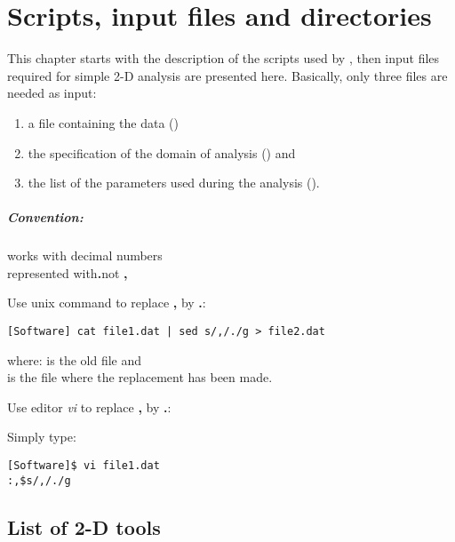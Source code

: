 \chapter{Scripts, input files and directories\label{chap:general}}

This chapter starts with the description of the scripts used by \diva, then input files required for simple 2-D analysis are presented here. 
Basically, only three files are needed as input:

\begin{enumerate}
\item a file containing the data ()
\item the specification of the domain of analysis () and 
\item the list of the parameters used during the analysis ().
\end{enumerate}


\minitoc

\newpage %


\paragraph*{Convention:} \diva works with decimal numbers\\ 
represented with\quad \textbf{.}\quad  not \quad \textbf{,}

\btips
Use unix command  to replace \textbf{,} by \textbf{.}:
\begin{lstlisting}[style=Bash]
[Software] cat file1.dat | sed s/,/./g > file2.dat
\end{lstlisting}

where:  is the old file and \\
\hphantom{where:}  is the file where the replacement has been made.
\etips


\btips
Use editor \textsl{vi} to replace \textbf{,} by \textbf{.}:

Simply type:
\begin{lstlisting}[style=Bash]
[Software]$ vi file1.dat
:,$s/,/./g
\end{lstlisting}

\etips



\section{List of 2-D tools}

